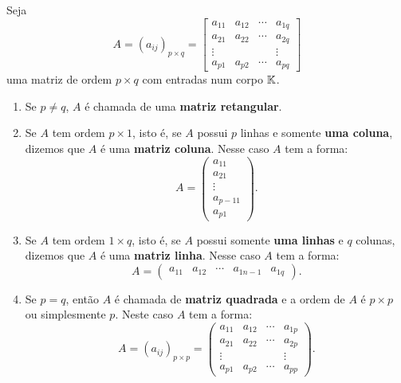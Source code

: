 \begin{definicao}
  Seja
  \[
    A = (a_{ij})_{p\times q} = \begin{bmatrix}
      a_{11} & a_{12} & \cdots & a_{1q}\\
      a_{21} & a_{22} & \cdots & a_{2q}\\
      \vdots & & & \vdots\\
      a_{p1} & a_{p2} & \cdots & a_{pq}
    \end{bmatrix}
  \]
  uma matriz de ordem $p\times q$ com entradas num corpo $\mathbb{K}$.

  \begin{enumerate}
    \item Se $p \ne q$, $A$ é chamada de uma \textbf{matriz retangular}.

    \item Se $A$ tem ordem $p \times 1$, isto é, se $A$ possui $p$ linhas e somente \textbf{uma coluna}, dizemos que $A$ é uma \textbf{matriz coluna}. Nesse caso $A$ tem a forma:
    \[
      A = \begin{pmatrix}a_{11}\\a_{21}\\\vdots\\a_{p - 11}\\a_{p1}\end{pmatrix}.
    \]
    \item Se $A$ tem ordem $1 \times q$, isto é, se $A$ possui somente \textbf{uma linhas} e $q$ colunas, dizemos que $A$ é uma \textbf{matriz linha}. Nesse caso $A$ tem a forma:
    \[
      A = \begin{pmatrix}a_{11} & a_{12} & \cdots & a_{1n-1} & a_{1q}\end{pmatrix}.
    \]
    \item Se $p = q$, então $A$ é chamada de \textbf{matriz quadrada} e a ordem de $A$ é $p \times p$ ou simplesmente $p$. Neste caso $A$ tem a forma:
    \[
      A = (a_{ij})_{p\times p} = \begin{pmatrix}
        a_{11} & a_{12} & \cdots & a_{1p}\\
        a_{21} & a_{22} & \cdots & a_{2p}\\
        \vdots & & & \vdots\\
        a_{p1} & a_{p2} & \cdots & a_{pp}
      \end{pmatrix}.
    \]
  \end{enumerate}
\end{definicao}

